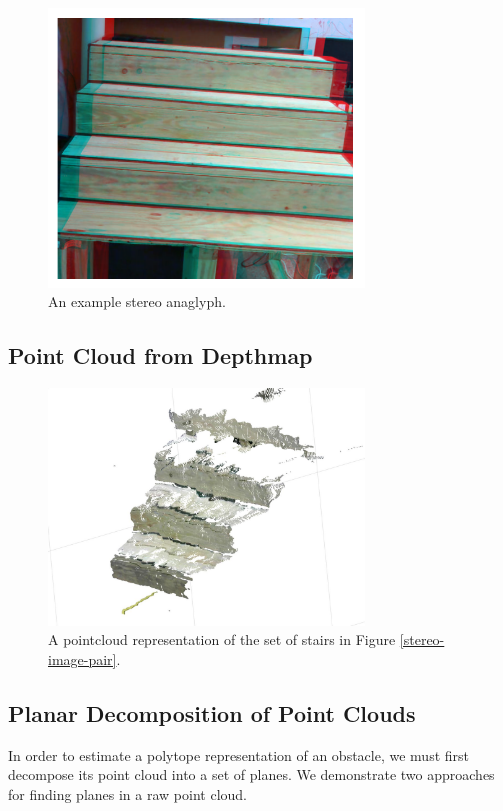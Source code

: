 \begin{figure}[!h]
\centering
\includegraphics[width=3.3in]{Sections/Figures/stereo_anaglyph.png}
\caption{An example stereo anaglyph.}
\label{stereo-anaglyph}
\end{figure}

\subsection{Point Cloud from Depthmap} \label{pointcloud-section}

\begin{figure}[!h]
\centering
\includegraphics[width=3.3in]{Sections/Figures/example_stairs_pointcloud.jpg}
\caption{A pointcloud representation of the set of stairs in Figure \ref{stereo-image-pair}.}
\label{pointcloud-example}
\end{figure}

\subsection{Planar Decomposition of Point Clouds} \label{plane-section}

In order to estimate a polytope representation of an obstacle, we must first decompose its point cloud into a set of planes. We demonstrate two approaches for finding planes in a raw point cloud. 

